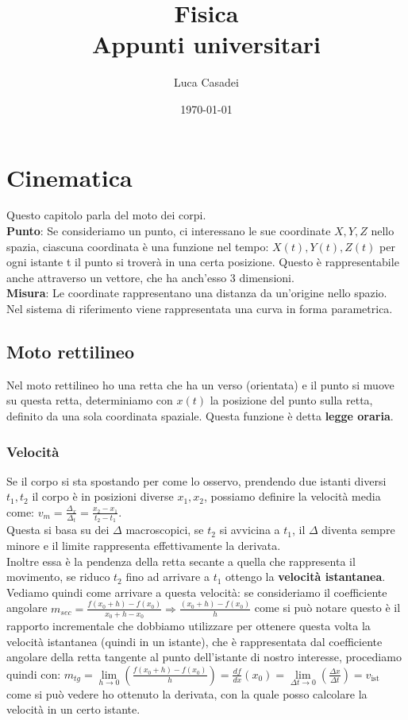 \documentclass[a4paper,12pt]{report}
\title{\textbf{Fisica}\\Appunti universitari}
\author{Luca Casadei}
\date{\today}
\begin{document}
	\maketitle
	\tableofcontents
	\chapter{Cinematica}
	Questo capitolo parla del moto dei corpi.\\
	\textbf{Punto}: Se consideriamo un punto, ci interessano le sue coordinate ${X,Y,Z}$ nello spazia, ciascuna coordinata è una funzione nel tempo:
	${X(t),Y(t),Z(t)}$ per ogni istante t il punto si troverà in una certa posizione. Questo è rappresentabile anche attraverso un vettore, che ha anch'esso 3 dimensioni.\\
	\textbf{Misura}: Le coordinate rappresentano una distanza da un'origine nello spazio.
	Nel sistema di riferimento viene rappresentata una curva in forma parametrica.
	\section{Moto rettilineo}
	Nel moto rettilineo ho una retta che ha un verso (orientata) e il punto si muove su questa retta, determiniamo con ${x(t)}$ la posizione del punto sulla retta, definito da una sola coordinata spaziale. Questa funzione è detta \textbf{legge oraria}.
	\subsection{Velocità}
	Se il corpo si sta spostando per come lo osservo, prendendo due istanti diversi ${t_1,t_2}$ il corpo è in posizioni diverse ${x_1,x_2}$, possiamo definire la velocità media come: ${v_m = \frac{\Delta_x}{\Delta_t} = \frac{x_2 - x_1}{t_2 - t_1}}$.\\
	Questa si basa su dei ${\Delta}$ macroscopici, se ${t_2}$ si avvicina a ${t_1}$, il ${\Delta}$ diventa sempre minore e il limite rappresenta effettivamente la derivata.\\
	Inoltre essa è la pendenza della retta secante a quella che rappresenta il movimento, se riduco $t_2$ fino ad arrivare a $t_1$ ottengo la \textbf{velocità istantanea}.\\
	Vediamo quindi come arrivare a questa velocità: se consideriamo il coefficiente angolare $m_{sec} = {{\frac{f(x_0 + h) - f(x_0)}{x_0 + h - x_0}} \Rightarrow {\frac{(x_0 + h) - f(x_0)}{h}}}$ come si può notare questo è il rapporto incrementale che dobbiamo utilizzare per ottenere questa volta la velocità istantanea (quindi in un istante), che è rappresentata dal coefficiente angolare della retta tangente al punto dell'istante di nostro interesse, procediamo quindi con: $m_{tg} = {\lim\limits_{h\to0}(\frac{f(x_0 + h) - f(x_0)}{h})} = {\frac{df}{dx}(x_0)} = {\lim\limits_{\Delta t\to0}(\frac{\Delta x}{\Delta t})} = v_{\text{ist}}$ come si può vedere ho ottenuto la derivata, con la quale posso calcolare la velocità in un certo istante.
\end{document}
